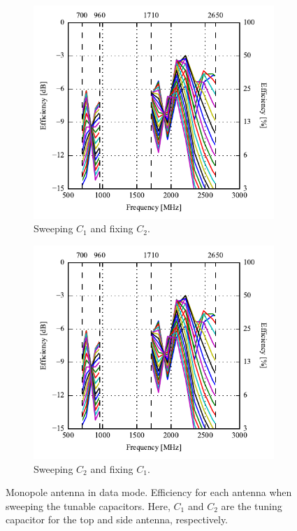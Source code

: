 \begin{figure}[htbp]
    \centering
    \begin{subfigure}{0.49\linewidth}
        \includegraphics{img/tech_sol/monopole/highband/ue/datamode/eff_top.pdf}
        \caption{Sweeping $C_1$ and fixing $C_2$.}
    \end{subfigure}
    \hfill
    \begin{subfigure}{0.49\linewidth}
        \includegraphics{img/tech_sol/monopole/highband/ue/datamode/eff_top.pdf}
        \caption{Sweeping $C_2$ and fixing $C_1$.}
    \end{subfigure}
    \caption{Monopole antenna in data mode. Efficiency for each antenna when sweeping the tunable capacitors. Here, $C_1$ and $C_2$ are the tuning capacitor for the top and side antenna, respectively.}
    \label{fig:eff_mono_modi_data_mode}
\end{figure}

